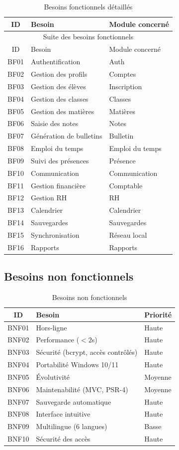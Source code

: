 \documentclass[12pt,a4paper,twoside]{report}
\begin{document}
\begin{longtable}{clp{7cm}}
\caption{Besoins fonctionnels détaillés}\\
\toprule
ID & Besoin & Module concerné \\
\midrule
\endfirsthead
\multicolumn{3}{c}{Suite des besoins fonctionnels}\\
\toprule
ID & Besoin & Module concerné \\
\midrule
\endhead
\bottomrule
\endfoot
BF01 & Authentification & Auth \\
BF02 & Gestion des profils & Comptes \\
BF03 & Gestion des élèves & Inscription \\
BF04 & Gestion des classes & Classes \\
BF05 & Gestion des matières & Matières \\
BF06 & Saisie des notes & Notes \\
BF07 & Génération de bulletins & Bulletin \\
BF08 & Emploi du temps & Emploi du temps \\
BF09 & Suivi des présences & Présence \\
BF10 & Communication & Communication \\
BF11 & Gestion financière & Comptable \\
BF12 & Gestion RH & RH \\
BF13 & Calendrier & Calendrier \\
BF14 & Sauvegardes & Sauvegardes \\
BF15 & Synchronisation & Réseau local \\
BF16 & Rapports & Rapports \\
\end{longtable}

\subsection{Besoins non fonctionnels}

\begin{table}[h]
\centering
\caption{Besoins non fonctionnels}
\begin{tabular}{cll}
\toprule
ID & Besoin & Priorité \\
\midrule
BNF01 & Hors-ligne & Haute \\
BNF02 & Performance ($<2$s) & Haute \\
BNF03 & Sécurité (bcrypt, accès contrôlés) & Haute \\
BNF04 & Portabilité Windows 10/11 & Haute \\
BNF05 & Évolutivité & Moyenne \\
BNF06 & Maintenabilité (MVC, PSR-4) & Moyenne \\
BNF07 & Sauvegarde automatique & Haute \\
BNF08 & Interface intuitive & Haute \\
BNF09 & Multilingue (6 langues) & Basse \\
BNF10 & Sécurité des accès & Haute \\
\bottomrule
\end{tabular}
\end{table}
\end{document}
